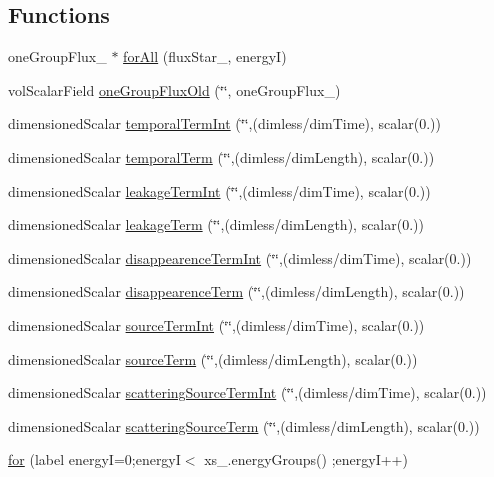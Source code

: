 \subsection*{Functions}
\begin{DoxyCompactItemize}
\item 
one\+Group\+Flux\+\_\+ $\ast$ \hyperlink{integralPredictor_8H_afe8323c0774ef442e2e4c019cce98890}{for\+All} (flux\+Star\+\_\+, energyI)
\item 
vol\+Scalar\+Field \hyperlink{integralPredictor_8H_a34c5d9843ad8c67cedc393b8b7e6d3a0}{one\+Group\+Flux\+Old} (\char`\"{}\char`\"{}, one\+Group\+Flux\+\_\+)
\item 
dimensioned\+Scalar \hyperlink{integralPredictor_8H_a6a6bc2b4b802b67f7144e4fd168ce1b5}{temporal\+Term\+Int} (\char`\"{}\char`\"{},(dimless/dim\+Time), scalar(0.))
\item 
dimensioned\+Scalar \hyperlink{integralPredictor_8H_aa467be9189f64fd789d4f0e5350f774d}{temporal\+Term} (\char`\"{}\char`\"{},(dimless/dim\+Length), scalar(0.))
\item 
dimensioned\+Scalar \hyperlink{integralPredictor_8H_a1edc21b2e8fa9d1796ee10236abc2889}{leakage\+Term\+Int} (\char`\"{}\char`\"{},(dimless/dim\+Time), scalar(0.))
\item 
dimensioned\+Scalar \hyperlink{integralPredictor_8H_a14716655bc7cabcaa62145cd5403f125}{leakage\+Term} (\char`\"{}\char`\"{},(dimless/dim\+Length), scalar(0.))
\item 
dimensioned\+Scalar \hyperlink{integralPredictor_8H_af3f24745c62331a2c7c7bd0dead37b6a}{disappearence\+Term\+Int} (\char`\"{}\char`\"{},(dimless/dim\+Time), scalar(0.))
\item 
dimensioned\+Scalar \hyperlink{integralPredictor_8H_ab21a35b9626b02d7f55c804a04c79456}{disappearence\+Term} (\char`\"{}\char`\"{},(dimless/dim\+Length), scalar(0.))
\item 
dimensioned\+Scalar \hyperlink{integralPredictor_8H_ac69cf9b0ca49bbc73bbd8757cc3ebae3}{source\+Term\+Int} (\char`\"{}\char`\"{},(dimless/dim\+Time), scalar(0.))
\item 
dimensioned\+Scalar \hyperlink{integralPredictor_8H_a9f27d4283866b0f185dc27a817c5da2e}{source\+Term} (\char`\"{}\char`\"{},(dimless/dim\+Length), scalar(0.))
\item 
dimensioned\+Scalar \hyperlink{integralPredictor_8H_a6c06ef7a771d3996b52235080e43589b}{scattering\+Source\+Term\+Int} (\char`\"{}\char`\"{},(dimless/dim\+Time), scalar(0.))
\item 
dimensioned\+Scalar \hyperlink{integralPredictor_8H_a054d85a1188784dbd918217cb90dd901}{scattering\+Source\+Term} (\char`\"{}\char`\"{},(dimless/dim\+Length), scalar(0.))
\item 
\hyperlink{integralPredictor_8H_a9e2f51bb368ba752c8b024e174e2908b}{for} (label energyI=0;energyI$<$ xs\+\_\+.\+energy\+Groups() ;energyI++)
\end{DoxyCompactItemize}

